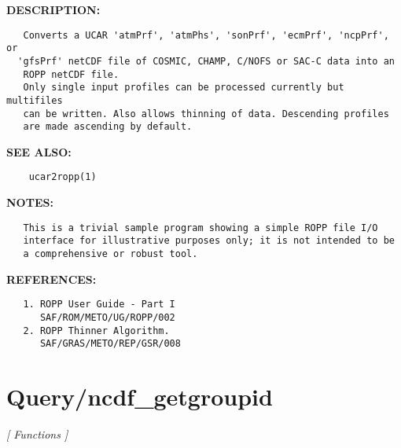 \textbf{DESCRIPTION:}\hspace{0.08in}\begin{Verbatim}
   Converts a UCAR 'atmPrf', 'atmPhs', 'sonPrf', 'ecmPrf', 'ncpPrf', or
  'gfsPrf' netCDF file of COSMIC, CHAMP, C/NOFS or SAC-C data into an
   ROPP netCDF file.
   Only single input profiles can be processed currently but multifiles
   can be written. Also allows thinning of data. Descending profiles
   are made ascending by default.
\end{Verbatim}
\textbf{SEE ALSO:}\hspace{0.08in}\begin{Verbatim}
    ucar2ropp(1)
\end{Verbatim}
\textbf{NOTES:}\hspace{0.08in}\begin{Verbatim}
   This is a trivial sample program showing a simple ROPP file I/O
   interface for illustrative purposes only; it is not intended to be
   a comprehensive or robust tool.
\end{Verbatim}
\textbf{REFERENCES:}\hspace{0.08in}\begin{Verbatim}
   1. ROPP User Guide - Part I
      SAF/ROM/METO/UG/ROPP/002
   2. ROPP Thinner Algorithm.
      SAF/GRAS/METO/REP/GSR/008
\end{Verbatim}
\section{Query/ncdf\_getgroupid}
\textsl{[ Functions ]}

